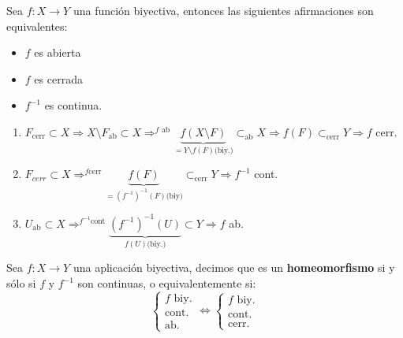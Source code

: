 \begin{prop}
Sea $f:X\rightarrow Y$ una función biyectiva, entonces las siguientes afirmaciones son equivalentes:
\begin{itemize}
    \item $f$ es abierta
    \item $f$ es cerrada
    \item $f^{-1}$ es continua.
\end{itemize}
\end{prop}
\begin{demo}
\begin{enumerate}
    \item $F_{\text{cerr}} \subset X \Rightarrow X\setminus F_{\text{ab}} \subset X \Rightarrow^{ f\text{ ab}} \underbrace{f\left( X\setminus F \right)}_{= Y\setminus f\left( F \right) \text{(biy.)}} \subset_{\text{ab}} X \Rightarrow f\left( F \right) \subset_{\text{cerr}} Y \Rightarrow f$ cerr.

    \item $F_{cerr} \subset X \Rightarrow^{f \text{cerr}} \underbrace{f\left( F \right)}_{= \left( f^{-1} \right)^{-1} \left( F \right) \text{(biy)}} \subset_{\text{cerr}} Y \Rightarrow f^{-1}$ cont.

    \item $U_{\text{ab}} \subset X \Rightarrow^{f^{-1} \text{cont}} \underbrace{\left( f^{-1} \right) ^{-1} \left( U \right) }_{f\left( U \right) \text{(biy.)}} \subset Y \Rightarrow f$ ab.
\end{enumerate}
\end{demo}

\begin{defi}[Homeomorfismo]
Sea $f: X \rightarrow Y$ una aplicación biyectiva, decimos que es un \textbf{homeomorfismo} si y sólo si $f$ y $f^{-1}$ son continuas, o equivalentemente si:
    \[
    \begin{cases}
        f \text{ biy.}\\
        \text{cont.}\\
        \text{ab.} 
    \end{cases} \Leftrightarrow \begin{cases}
        f \text{ biy.}\\
        \text{cont.}\\
        \text{cerr.}
    \end{cases} 
    \]
\end{defi}

